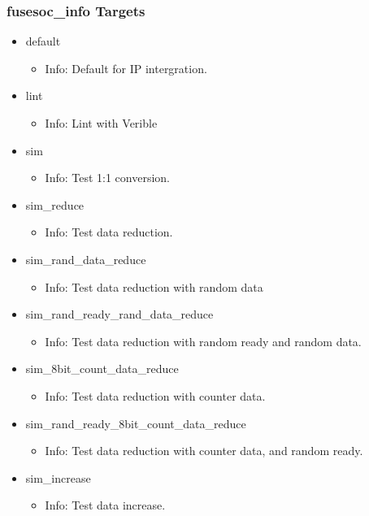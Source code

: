 \subsubsection{fusesoc\_info Targets}
\begin{itemize}
\item default
	\begin{itemize}
	\item[$\space$] Info: Default for IP intergration.
	\end{itemize}
\item lint
	\begin{itemize}
	\item[$\space$] Info: Lint with Verible
	\end{itemize}
\item sim
	\begin{itemize}
	\item[$\space$] Info: Test 1:1 conversion.
	\end{itemize}
\item sim\_reduce
	\begin{itemize}
	\item[$\space$] Info: Test data reduction.
	\end{itemize}
\item sim\_rand\_data\_reduce
	\begin{itemize}
	\item[$\space$] Info: Test data reduction with random data
	\end{itemize}
\item sim\_rand\_ready\_rand\_data\_reduce
	\begin{itemize}
	\item[$\space$] Info: Test data reduction with random ready and random data.
	\end{itemize}
\item sim\_8bit\_count\_data\_reduce
	\begin{itemize}
	\item[$\space$] Info: Test data reduction with counter data.
	\end{itemize}
\item sim\_rand\_ready\_8bit\_count\_data\_reduce
	\begin{itemize}
	\item[$\space$] Info: Test data reduction with counter data, and random ready.
	\end{itemize}
\item sim\_increase
	\begin{itemize}
	\item[$\space$] Info: Test data increase.

\end{itemize}
\end{itemize}
